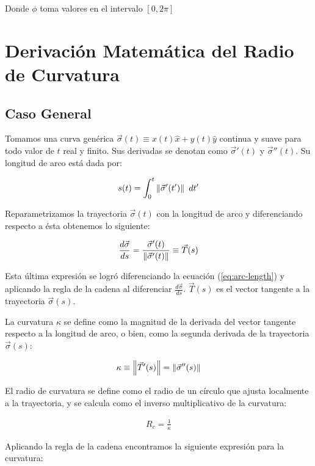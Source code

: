 Donde $\phi$ toma valores en el intervalo $[0, 2\pi]$

\chapter[Radio de Curvatura]{Derivación Matemática del Radio de Curvatura}
\label{app:math-curvature-radius}
\thispagestyle{empty}
\section{Caso General}
Tomamos una curva genérica $\vec{\sigma}(t) \equiv x(t) \hat{x} + y(t) \hat{y}$ continua y suave para todo valor de $t$ real y finito. Sus derivadas se denotan como $\vec{\sigma}'(t)$ y $\vec{\sigma}''(t)$. Su longitud de arco está dada por:

\begin{align}
  s(t) = \int^t_0 \left\lVert\vec{\sigma}'(t')\right\rVert~dt' \label{eq:arc-length}
\end{align}

Reparametrizamos la trayectoria $\vec{\sigma}(t)$ con la longitud de arco y diferenciando respecto a ésta obtenemos lo siguiente:

\begin{align}
  \frac{d\vec{\sigma}}{ds} = \frac{\vec{\sigma}'(t)}{\left\lVert\vec{\sigma}'(t)\right\rVert} \equiv \vec{T}(s)
\end{align}

Esta última expresión se logró diferenciando la ecuación (\ref{eq:arc-length}) y aplicando la regla de la cadena al diferenciar $\frac{d\vec{\sigma}}{ds}$. $\vec{T}(s)$ es el vector tangente a la trayectoria $\vec{\sigma}(s)$.

La curvatura $\kappa$ se define como la magnitud de la derivada del vector tangente respecto a la longitud de arco, o bien, como la segunda derivada de la trayectoria $\vec{\sigma}(s)$:

\begin{align}
  \kappa \equiv \left\lVert\vec{T}'(s)\right\rVert = \left\lVert\vec{\sigma}''(s)\right\rVert 
\end{align}

El radio de curvatura se define como el radio de un círculo que ajusta localmente a la trayectoria, y se calcula como el inverso
multiplicativo de la curvatura:

\begin{align}
  R_c = \frac{1}{\kappa}
\end{align}

Aplicando la regla de la cadena encontramos la siguiente expresión para la curvatura:


